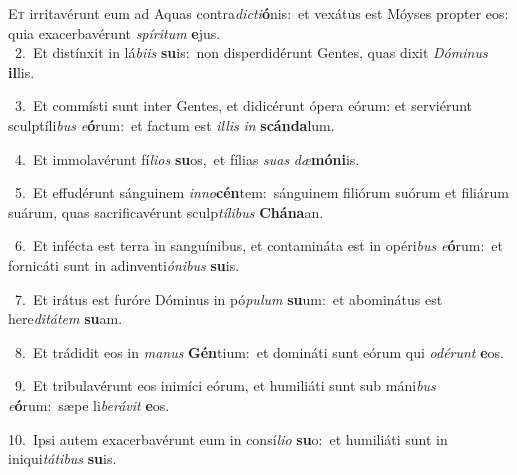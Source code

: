\lettrine{\initial\textcolor{\initialcolor}{E}}{t} irritavérunt eum ad Aquas contra\-\textit{dic}\-\textit{ti}\textbf{ó}nis:~\star et vexátus est Móyses propter eos: quia exacerbavérunt \textit{spí}\-\textit{ri}\textit{tum} \textbf{e}\-jus.\\
{\numbfont\textcolor{\numbcolor}{~2.}}~Et distínxit in lá\-\textit{bi}\-\textit{is} \textbf{su}\-is:~\star non disperdidérunt Gentes, quas dixit \textit{Dó}\-\textit{mi}\textit{nus} \textbf{il}\-lis.\par
{\numbfont\textcolor{\numbcolor}{~3.}}~Et commísti sunt inter Gentes, et didicérunt ópera eórum: et serviérunt sculptíli\textit{bus} \textit{e}\-\textbf{ó}rum:~\star et factum est \textit{il}\-\textit{lis} \textit{in} \textbf{scán}\-\textbf{da}lum.\par
{\numbfont\textcolor{\numbcolor}{~4.}}~Et immolavérunt fí\-\textit{li}\-\textit{os} \textbf{su}\-os,~\star et fílias \textit{su}\-\textit{as} \textit{dæ}\-\textbf{mó}\textbf{ni}is.\par
{\numbfont\textcolor{\numbcolor}{~5.}}~Et effudérunt sánguinem \textit{in}\-\textit{no}\textbf{cén}tem:~\star sánguinem filiórum suórum et filiárum suárum, quas sacrificavérunt sculp\-\textit{tí}\-\textit{li}\textit{bus} \textbf{Chá}\-\textbf{na}an.\par
{\numbfont\textcolor{\numbcolor}{~6.}}~Et infécta est terra in sanguínibus, et contamináta est in opéri\textit{bus} \textit{e}\-\textbf{ó}rum:~\star et fornicáti sunt in adinventi\-\textit{ó}\-\textit{ni}\textit{bus} \textbf{su}\-is.\par
{\numbfont\textcolor{\numbcolor}{~7.}}~Et irátus est furóre Dóminus in pó\-\textit{pu}\-\textit{lum} \textbf{su}\-um:~\star et abominátus est here\-\textit{di}\-\textit{tá}\textit{tem} \textbf{su}\-am.\par
{\numbfont\textcolor{\numbcolor}{~8.}}~Et trádidit eos in \textit{ma}\-\textit{nus} \textbf{Gén}\-tium:~\star et domináti sunt eórum qui \textit{o}\-\textit{dé}\textit{runt} \textbf{e}\-os.\par
{\numbfont\textcolor{\numbcolor}{~9.}}~Et tribulavérunt eos inimíci eórum, et humiliáti sunt sub máni\textit{bus} \textit{e}\-\textbf{ó}rum:~\star sæpe li\-\textit{be}\-\textit{rá}\textit{vit} \textbf{e}\-os.\par
{\numbfont\textcolor{\numbcolor}{10.}}~Ipsi autem exacerbavérunt eum in consí\-\textit{li}\-\textit{o} \textbf{su}\-o:~\star et humiliáti sunt in iniqui\-\textit{tá}\-\textit{ti}\textit{bus} \textbf{su}\-is.\par
